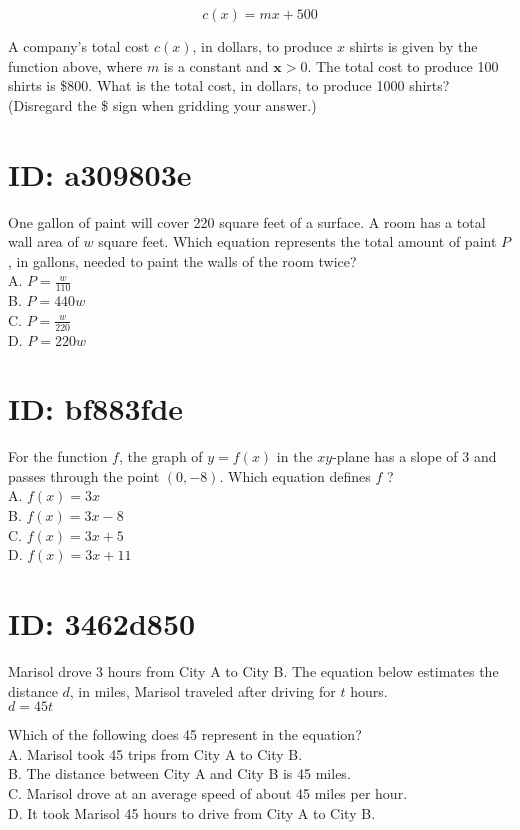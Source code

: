 $$
c(x)=m x+500
$$

A company's total cost $c(x)$, in dollars, to produce $x$ shirts is given by the function above, where $m$ is a constant and $\boldsymbol{x}>0$. The total cost to produce 100 shirts is \$800. What is the total cost, in dollars, to produce 1000 shirts? (Disregard the \$ sign when gridding your answer.)

\section*{ID: a309803e}
One gallon of paint will cover 220 square feet of a surface. A room has a total wall area of $w$ square feet. Which equation represents the total amount of paint $P$, in gallons, needed to paint the walls of the room twice?\\
A. $P=\frac{w}{110}$\\
B. $P=440 w$\\
C. $P=\frac{w}{220}$\\
D. $P=220 w$

\section*{ID: bf883fde}
For the function $f$, the graph of $y=f(x)$ in the $x y$-plane has a slope of 3 and passes through the point $(0,-8)$. Which equation defines $f$ ?\\
A. $f(x)=3 x$\\
B. $f(x)=3 x-8$\\
C. $f(x)=3 x+5$\\
D. $f(x)=3 x+11$

\section*{ID: 3462d850}
Marisol drove 3 hours from City A to City B. The equation below estimates the distance $d$, in miles, Marisol traveled after driving for $t$ hours.\\
$d=45 t$

Which of the following does 45 represent in the equation?\\
A. Marisol took 45 trips from City A to City B.\\
B. The distance between City A and City B is 45 miles.\\
C. Marisol drove at an average speed of about 45 miles per hour.\\
D. It took Marisol 45 hours to drive from City A to City B.

